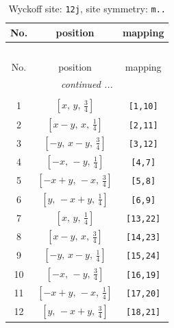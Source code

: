 \documentclass[fleqn,8pt]{jsarticle}
\begin{document}
\begin{longtable}{ccc}
\caption{Wyckoff site: {\tt 12j}, site symmetry: {\tt m..}}
 \\
 \hline \hline
No. & position & mapping \\ \hline \endfirsthead

\multicolumn{2}{l}{\tablename\ \thetable{}} \\
 \hline \hline
No. & position & mapping \\ \hline \endhead

 \hline \hline
\multicolumn{2}{r}{\footnotesize\it continued ...} \\ \endfoot

 \hline \hline
\multicolumn{2}{r}{} \\ \endlastfoot

1 & $\left[ x,\, y,\, \frac{3}{4} \right]$ & {\tt [1,10]} \\ \hline
2 & $\left[ x - y,\, x,\, \frac{1}{4} \right]$ & {\tt [2,11]} \\ \hline
3 & $\left[ - y,\, x - y,\, \frac{3}{4} \right]$ & {\tt [3,12]} \\ \hline
4 & $\left[ - x,\, - y,\, \frac{1}{4} \right]$ & {\tt [4,7]} \\ \hline
5 & $\left[ - x + y,\, - x,\, \frac{3}{4} \right]$ & {\tt [5,8]} \\ \hline
6 & $\left[ y,\, - x + y,\, \frac{1}{4} \right]$ & {\tt [6,9]} \\ \hline
7 & $\left[ x,\, y,\, \frac{1}{4} \right]$ & {\tt [13,22]} \\ \hline
8 & $\left[ x - y,\, x,\, \frac{3}{4} \right]$ & {\tt [14,23]} \\ \hline
9 & $\left[ - y,\, x - y,\, \frac{1}{4} \right]$ & {\tt [15,24]} \\ \hline
10 & $\left[ - x,\, - y,\, \frac{3}{4} \right]$ & {\tt [16,19]} \\ \hline
11 & $\left[ - x + y,\, - x,\, \frac{1}{4} \right]$ & {\tt [17,20]} \\ \hline
12 & $\left[ y,\, - x + y,\, \frac{3}{4} \right]$ & {\tt [18,21]} \\
\end{longtable}
\renewcommand{\arraystretch}{1.2}
\end{document}
